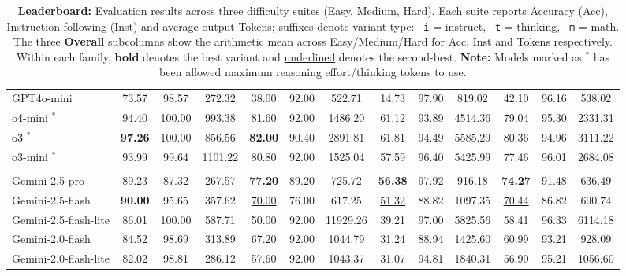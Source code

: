 \begin{table}
\begin{adjustbox}{width=\textwidth}
\begin{tabulary}{1.3\textwidth}{LCCCCCCCCCCCC}
GPT4o-mini  & 73.57 & 98.57 & 272.32 & 38.00 & 92.00 & 522.71 & 14.73 & 97.90 & 819.02 &  42.10 &  96.16 &  538.02 \\
o4-mini $^*$ & 94.40 & 100.00 & 993.38 & \underline{81.60} & 92.00 & 1486.20 & 61.12 & 93.89 & 4514.36 &  79.04 &  95.30 &  2331.31 \\
o3 $^*$ & \textbf{97.26} & 100.00 & 856.56 & \textbf{82.00} & 90.40 & 2891.81 & 61.81 & 94.49 & 5585.29 &  80.36 &  94.96 &  3111.22 \\
o3-mini $^*$ & 93.99 & 99.64 & 1101.22 & 80.80 & 92.00 & 1525.04 & 57.59 & 96.40 & 5425.99 &  77.46 &  96.01 &  2684.08 \\
\midrule 
{}
 \\
\midrule
Gemini-2.5-pro & \underline{89.23} & 87.32 & 267.57 & \textbf{77.20} & 89.20 & 725.72 & \textbf{56.38} & 97.92 & 916.18 &  \textbf{74.27} &  91.48 &  636.49 \\
Gemini-2.5-flash  & \textbf{90.00} & 95.65 & 357.62 & \underline{70.00} & 76.00 & 617.25 & \underline{51.32} & 88.82 & 1097.35 &  \underline{70.44} &  86.82 &  690.74 \\
Gemini-2.5-flash-lite  & 86.01 & 100.00 & 587.71 & 50.00 & 92.00 & 11929.26 & 39.21 & 97.00 & 5825.56 &  58.41 &  96.33 &  6114.18 \\
Gemini-2.0-flash  & 84.52 & 98.69 & 313.89 & 67.20 & 92.00 & 1044.79 & 31.24 & 88.94 & 1425.60 &  60.99 &  93.21 &  928.09 \\
Gemini-2.0-flash-lite  & 82.02 & 98.81 & 286.12 & 57.60 & 92.00 & 1043.37 & 31.07 & 94.81 & 1840.31 &  56.90 &  95.21 &  1056.60 \\
\bottomrule
\end{tabulary}
\end{adjustbox}
\caption{\textbf{\our Leaderboard:} Evaluation results across three difficulty suites (Easy, Medium, Hard). Each suite reports Accuracy (Acc), Instruction-following (Inst) and average output Tokens; suffixes denote variant type: \texttt{-i} = instruct, \texttt{-t} = thinking, \texttt{-m} = math. The three \textbf{Overall} subcolumns show the arithmetic mean across Easy/Medium/Hard for Acc, Inst and Tokens respectively. Within each family, \textbf{bold} denotes the best variant and \underline{underlined} denotes the second-best. \textbf{Note:} Models marked as $^*$ has been allowed maximum reasoning effort/thinking tokens to use.}
\label{main:beyondbench_leaderboard_updated}
\end{table}